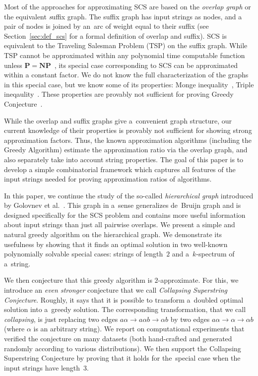 \documentclass[11pt]{article}
\begin{document}


Most of the approaches for approximating SCS are based on the
{\em overlap graph} or the equivalent {\emph suffix graph}. The suffix graph has input strings as nodes, and a pair of nodes 
is joined by an~arc of weight equal to their suffix (see Section~\ref{sec:def_scs} for a formal definition of overlap and suffix).
SCS is equivalent to the Traveling Salesman Problem (TSP) on the suffix graph. While TSP cannot be approximated within any polynomial time computable function unless $\mathbf{P}=\mathbf{NP}$~\cite{SG1976}, its special case corresponding to SCS can be approximated within a constant factor. We do not know the full characterization of the graphs in this special case, but we know some of its properties: Monge inequality~\cite{monge}, Triple ineqaulity~\cite{weinard2006greedy}. These properties are provably not sufficient for proving Greedy Conjecture~\cite{weinard2006greedy, laube2005conditional}. 

While the overlap and suffix graphs give a~convenient graph structure, our current knowledge of their properties is provably not sufficient for showing strong approximation factors. Thus, the known approximation algorithms (including the Greedy Algorithm) estimate the approximation ratio via the overlap graph, and also separately take into account string properties. The goal of this paper is to develop a simple combinatorial framework which captures all features of the input strings needed for proving approximation ratios of algorithms.

In this paper, we continue the study of the so-called {\em hierarchical graph}
introduced by Golovnev et al.~\cite{scs_exact}. This graph in a~sense generalizes de~Bruijn graph and is designed specifically 
for the SCS problem and contains more useful information about input strings
than just all pairwise overlaps. We present a simple and natural greedy algorithm
on the hierarchical graph. 
We demonstrate its usefulness by showing that it finds an optimal solution 
in two well-known polynomially solvable special cases: strings of length~$2$ and
a~$k$-spectrum of a~string.

We then conjecture that this greedy algorithm is $2$-approximate. For this, we introduce an {\em even stronger} conjecture that we call 
{\em Collapsing Superstring Conjecture}. 
Roughly, it says that it is possible to transform a~doubled optimal 
solution into a~greedy solution. 
The corresponding transformation, that we call {\em collapsing}, 
is just replacing two edges $a\alpha \to a\alpha b \to \alpha b$ 
by two edges $a\alpha \to \alpha \to \alpha b$ (where $\alpha$ is an arbitrary string). 
We report on computational experiments that verified the 
conjecture on many datasets (both hand-crafted and generated randomly
according to various distributions). 
We then support the Collapsing Superstring Conjecture by 
proving that it holds for the~special case when the input strings have length~3.
\end{document}
